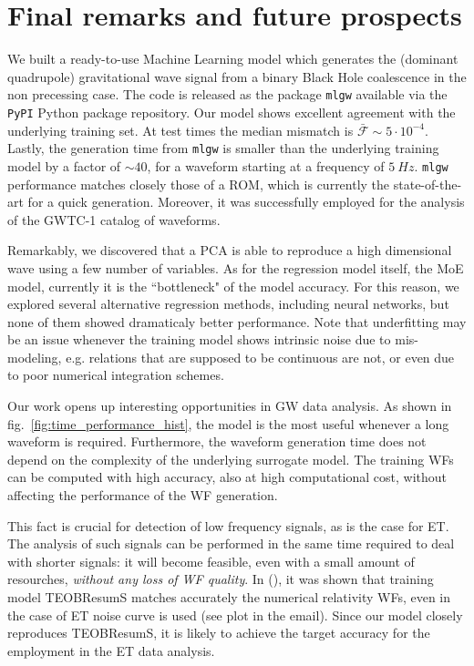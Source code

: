\section{Final remarks and future prospects}
\label{sec:end}
We built a ready-to-use Machine Learning model which generates the (dominant quadrupole) gravitational wave signal from a binary Black Hole coalescence in the non precessing case. The code is released as the package \texttt{mlgw} available via the \texttt{PyPI} Python package repository.
Our model shows excellent agreement with the underlying training set. At test times the median mismatch is $\bar{\mathcal{F}}\sim 5 \cdot 10^{-4}$. Lastly, the generation time from \texttt{mlgw} is smaller than the underlying training model by a factor of $\sim 40$, for a waveform starting at a frequency of $\SI{5}{Hz}$.
\texttt{mlgw} performance matches closely those of a ROM, which is currently the state-of-the-art for a quick generation.
Moreover, it was successfully employed for the analysis of the GWTC-1 catalog of waveforms.
\par
Remarkably, we discovered that a PCA is able to reproduce a high dimensional wave using a few number of variables. As for the regression model itself, the MoE model, currently it is the ``bottleneck" of the model accuracy. For this reason, we explored several alternative regression methods, including neural networks, but none of them showed dramaticaly better performance.
Note that underfitting may be an issue whenever the training model shows intrinsic noise due to mis-modeling, e.g. relations that are supposed to be continuous are not, or even due to poor numerical integration schemes.
\par
Our work opens up interesting opportunities in GW data analysis.
As shown in fig.~\ref{fig:time_performance_hist}, the model is the most useful whenever a long waveform is required. Furthermore, the waveform generation time does not depend on the complexity of the underlying surrogate model. The training WFs can be computed with high accuracy, also at high computational cost, without affecting the performance of the WF generation.
\par
This fact is crucial for detection of low frequency signals, as is the case for ET. The analysis of such signals can be performed in the same time required to deal with shorter signals: it will become feasible, even with a small amount of resourches, \textit{without any loss of WF quality}.
In \cite{} (), it was shown that training model TEOBResumS matches accurately the numerical relativity WFs, even in the case of ET noise curve is used (see plot in the email). Since our model closely reproduces TEOBResumS, it is likely to achieve the target accuracy for the employment in the ET data analysis.
\par


